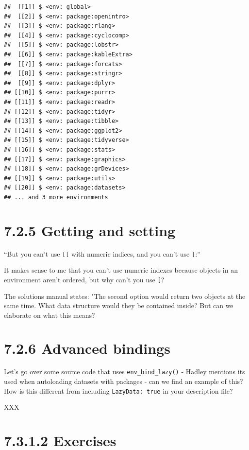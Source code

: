 \documentclass[]{book}
\begin{document}
\begin{verbatim}
##  [[1]] $ <env: global>
##  [[2]] $ <env: package:openintro>
##  [[3]] $ <env: package:rlang>
##  [[4]] $ <env: package:cyclocomp>
##  [[5]] $ <env: package:lobstr>
##  [[6]] $ <env: package:kableExtra>
##  [[7]] $ <env: package:forcats>
##  [[8]] $ <env: package:stringr>
##  [[9]] $ <env: package:dplyr>
## [[10]] $ <env: package:purrr>
## [[11]] $ <env: package:readr>
## [[12]] $ <env: package:tidyr>
## [[13]] $ <env: package:tibble>
## [[14]] $ <env: package:ggplot2>
## [[15]] $ <env: package:tidyverse>
## [[16]] $ <env: package:stats>
## [[17]] $ <env: package:graphics>
## [[18]] $ <env: package:grDevices>
## [[19]] $ <env: package:utils>
## [[20]] $ <env: package:datasets>
## ... and 3 more environments
\end{verbatim}

\hypertarget{getting-and-setting}{%
\section*{7.2.5 Getting and setting}\label{getting-and-setting}}

``But you can't use \texttt{{[}{[}} with numeric indices, and you can't use \texttt{{[}}:''

It makes sense to me that you can't use numeric indexes because objects in an environment aren't ordered, but why can't you use \texttt{{[}}?

The solutions manual states: "The second option would return two objects at the same time. What data structure would they be contained inside? But can we elaborate on what this means?

\hypertarget{advanced-bindings}{%
\section*{7.2.6 Advanced bindings}\label{advanced-bindings}}

Let's go over some source code that uses \texttt{env\_bind\_lazy()} - Hadley mentions its used when autoloading datasets with packages - can we find an example of this? How is this different from including \texttt{LazyData:\ true} in your description file?

XXX

\hypertarget{exercises-3}{%
\section*{7.3.1.2 Exercises}\label{exercises-3}}
\end{document}

